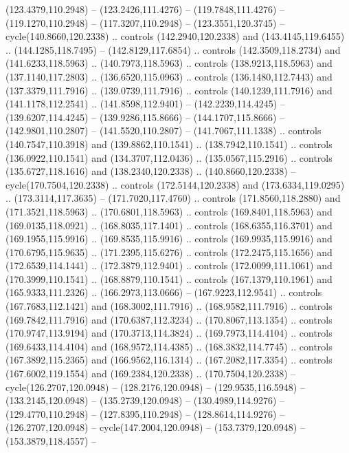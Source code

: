 \begin{scope}[cm={{1.25,0.0,0.0,-1.25,(0.0,442.91375)}}]
    (123.4379,110.2948) -- (123.2426,111.4276) -- (119.7848,111.4276) --
    (119.1270,110.2948) -- (117.3207,110.2948) -- (123.3551,120.3745) --
    cycle(140.8660,120.2338) .. controls (142.2940,120.2338) and
    (143.4145,119.6455) .. (144.1285,118.7495) -- (142.8129,117.6854) .. controls
    (142.3509,118.2734) and (141.6233,118.5963) .. (140.7973,118.5963) .. controls
    (138.9213,118.5963) and (137.1140,117.2803) .. (136.6520,115.0963) .. controls
    (136.1480,112.7443) and (137.3379,111.7916) .. (139.0739,111.7916) .. controls
    (140.1239,111.7916) and (141.1178,112.2541) .. (141.8598,112.9401) --
    (142.2239,114.4245) -- (139.6207,114.4245) -- (139.9286,115.8666) --
    (144.1707,115.8666) -- (142.9801,110.2807) -- (141.5520,110.2807) --
    (141.7067,111.1338) .. controls (140.7547,110.3918) and (139.8862,110.1541) ..
    (138.7942,110.1541) .. controls (136.0922,110.1541) and (134.3707,112.0436) ..
    (135.0567,115.2916) .. controls (135.6727,118.1616) and (138.2340,120.2338) ..
    (140.8660,120.2338) -- cycle(170.7504,120.2338) .. controls
    (172.5144,120.2338) and (173.6334,119.0295) .. (173.3114,117.3635) --
    (171.7020,117.4760) .. controls (171.8560,118.2880) and (171.3521,118.5963) ..
    (170.6801,118.5963) .. controls (169.8401,118.5963) and (169.0135,118.0921) ..
    (168.8035,117.1401) .. controls (168.6355,116.3701) and (169.1955,115.9916) ..
    (169.8535,115.9916) .. controls (169.9935,115.9916) and (170.6795,115.9635) ..
    (171.2395,115.6276) .. controls (172.2475,115.1656) and (172.6539,114.1441) ..
    (172.3879,112.9401) .. controls (172.0099,111.1061) and (170.3999,110.1541) ..
    (168.8879,110.1541) .. controls (167.1379,110.1961) and (165.9333,111.2326) ..
    (166.2973,113.0666) -- (167.9223,112.9541) .. controls (167.7683,112.1421) and
    (168.3002,111.7916) .. (168.9582,111.7916) .. controls (169.7842,111.7916) and
    (170.6387,112.3234) .. (170.8067,113.1354) .. controls (170.9747,113.9194) and
    (170.3713,114.3824) .. (169.7973,114.4104) .. controls (169.6433,114.4104) and
    (168.9572,114.4385) .. (168.3832,114.7745) .. controls (167.3892,115.2365) and
    (166.9562,116.1314) .. (167.2082,117.3354) .. controls (167.6002,119.1554) and
    (169.2384,120.2338) .. (170.7504,120.2338) -- cycle(126.2707,120.0948) --
    (128.2176,120.0948) -- (129.9535,116.5948) -- (133.2145,120.0948) --
    (135.2739,120.0948) -- (130.4989,114.9276) -- (129.4770,110.2948) --
    (127.8395,110.2948) -- (128.8614,114.9276) -- (126.2707,120.0948) --
    cycle(147.2004,120.0948) -- (153.7379,120.0948) -- (153.3879,118.4557) --

\end{scope}

